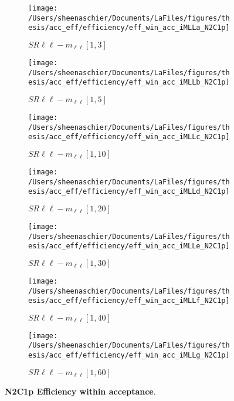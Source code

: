 \begin{figure}
        \centering
    \begin{subfigure}[b]{0.44\textwidth}
        \texttt{[image: /Users/sheenaschier/Documents/LaFiles/figures/thesis/acc\_eff/efficiency/eff\_win\_acc\_iMLLa\_N2C1p]}
    \caption{$SR\ell\ell-m_{\ell\ell} [1, 3]$}
    \end{subfigure}
    \begin{subfigure}[b]{0.44\textwidth}
        \texttt{[image: /Users/sheenaschier/Documents/LaFiles/figures/thesis/acc\_eff/efficiency/eff\_win\_acc\_iMLLb\_N2C1p]}
    \caption{$SR\ell\ell-m_{\ell\ell} [1, 5]$}
    \end{subfigure}
    \begin{subfigure}[b]{0.44\textwidth}
        \texttt{[image: /Users/sheenaschier/Documents/LaFiles/figures/thesis/acc\_eff/efficiency/eff\_win\_acc\_iMLLc\_N2C1p]}
    \caption{$SR\ell\ell-m_{\ell\ell} [1, 10]$}
    \end{subfigure}
    \begin{subfigure}[b]{0.44\textwidth}
        \texttt{[image: /Users/sheenaschier/Documents/LaFiles/figures/thesis/acc\_eff/efficiency/eff\_win\_acc\_iMLLd\_N2C1p]}
    \caption{$SR\ell\ell-m_{\ell\ell} [1, 20]$}
    \end{subfigure}
    \begin{subfigure}[b]{0.44\textwidth}
        \texttt{[image: /Users/sheenaschier/Documents/LaFiles/figures/thesis/acc\_eff/efficiency/eff\_win\_acc\_iMLLe\_N2C1p]}
    \caption{$SR\ell\ell-m_{\ell\ell} [1, 30]$}
    \end{subfigure}
    \begin{subfigure}[b]{0.44\textwidth}
        \texttt{[image: /Users/sheenaschier/Documents/LaFiles/figures/thesis/acc\_eff/efficiency/eff\_win\_acc\_iMLLf\_N2C1p]}
    \caption{$SR\ell\ell-m_{\ell\ell} [1, 40]$}
    \end{subfigure}
    \begin{subfigure}[b]{0.44\textwidth}
        \texttt{[image: /Users/sheenaschier/Documents/LaFiles/figures/thesis/acc\_eff/efficiency/eff\_win\_acc\_iMLLg\_N2C1p]}
    \caption{$SR\ell\ell-m_{\ell\ell} [1, 60]$}
    \end{subfigure}
    \caption{\textbf{N2C1p Efficiency within acceptance}.}
\end{figure}

